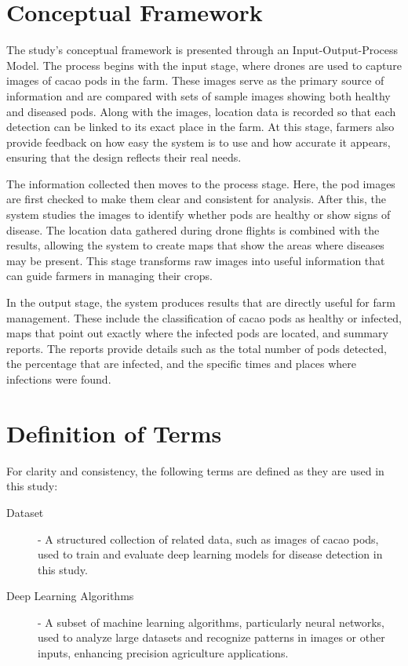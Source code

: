 {\section{Conceptual Framework}

The study's conceptual framework is presented through an Input-Output-Process Model. The process begins with the input stage, where drones are used to capture images of cacao pods in the farm. These images serve as the primary source of information and are compared with sets of sample images showing both healthy and diseased pods. Along with the images, location data is recorded so that each detection can be linked to its exact place in the farm. At this stage, farmers also provide feedback on how easy the system is to use and how accurate it appears, ensuring that the design reflects their real needs.

The information collected then moves to the process stage. Here, the pod images are first checked to make them clear and consistent for analysis. After this, the system studies the images to identify whether pods are healthy or show signs of disease. The location data gathered during drone flights is combined with the results, allowing the system to create maps that show the areas where diseases may be present. This stage transforms raw images into useful information that can guide farmers in managing their crops.

In the output stage, the system produces results that are directly useful for farm management. These include the classification of cacao pods as healthy or infected, maps that point out exactly where the infected pods are located, and summary reports. The reports provide details such as the total number of pods detected, the percentage that are infected, and the specific times and places where infections were found.


\section{Definition of Terms}

For clarity and consistency, the following terms are defined as they are used in this study:

\begin{description}
	\item[Dataset] - A structured collection of related data, such as images of cacao pods, used to train and evaluate deep learning models for disease detection in this study.

	\item[Deep Learning Algorithms] - A subset of machine learning algorithms, particularly neural networks, used to analyze large datasets and recognize patterns in images or other inputs, enhancing precision agriculture applications.


\end{description}}

